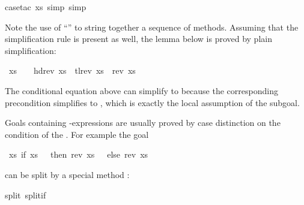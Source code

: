\begin{isabellebody}
case{\isacharunderscore}tac\ xs{\isacharcomma}\ simp{\isacharcomma}\ simp{\isacharparenright}\isanewline
{}%
\begin{isamarkuptext}%
\noindent
Note the use of ``'' to string together a
sequence of methods. Assuming that the simplification rule
is present as well,
the lemma below is proved by plain simplification:%
\end{isamarkuptext}%
\ {\isachardoublequote}xs\ {\isasymnoteq}\ {\isacharbrackleft}{\isacharbrackright}\ {\isasymLongrightarrow}\ hd{\isacharparenleft}rev\ xs{\isacharparenright}\ {\isacharhash}\ tl{\isacharparenleft}rev\ xs{\isacharparenright}\ {\isacharequal}\ rev\ xs{\isachardoublequote}%
\begin{isamarkuptext}%
\noindent
The conditional equation  above
can simplify  to 
because the corresponding precondition 
simplifies to , which is exactly the local
assumption of the subgoal.%
\end{isamarkuptext}%
%
%
\begin{isamarkuptext}%
Goals containing -expressions are usually proved by case
distinction on the condition of the . For example the goal%
\end{isamarkuptext}%
\ {\isachardoublequote}{\isasymforall}xs{\isachardot}\ if\ xs\ {\isacharequal}\ {\isacharbrackleft}{\isacharbrackright}\ then\ rev\ xs\ {\isacharequal}\ {\isacharbrackleft}{\isacharbrackright}\ else\ rev\ xs\ {\isasymnoteq}\ {\isacharbrackleft}{\isacharbrackright}{\isachardoublequote}%
\begin{isamarkuptxt}%
\noindent
can be split by a special method :%
\end{isamarkuptxt}%
split\ split{\isacharunderscore}if{\isacharparenright}%
\begin{isamarkuptxt}%

\end{isamarkuptxt}
\end{isabellebody}
